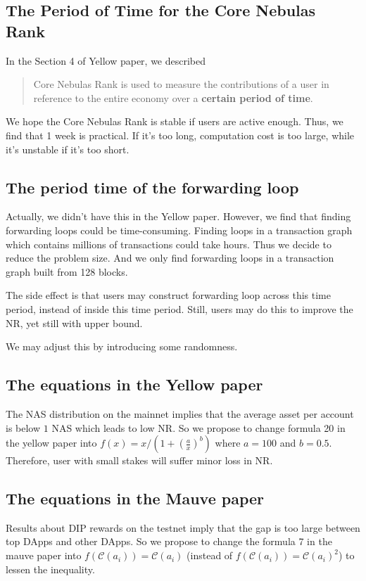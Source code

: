 \documentclass[11pt]{article}
\begin{document}
\subsection{The Period of Time for the Core Nebulas Rank}
In the Section 4 of Yellow paper, we described
\begin{quote}
Core Nebulas Rank is used to measure the contributions of a user in reference
  to the entire economy over a \textbf{certain period of time}.
\end{quote}
\noindent We hope the Core Nebulas Rank is stable if users are active enough.
Thus, we find that 1 week is  practical. If it's too long, computation cost is
too large, while it's unstable if it's too short.

\subsection{The period time of the forwarding loop}
Actually, we didn't have this in the Yellow paper. However, we find that
finding forwarding loops could be time-consuming. Finding loops in a
transaction graph which contains millions of transactions could take hours.
Thus we decide to reduce the problem size. And we only find forwarding loops in
a transaction graph built from 128 blocks.

The side effect is that users may construct forwarding loop across this time
period, instead of inside this time period. Still, users may do this to improve
the NR, yet still with upper bound.

We may adjust this by introducing some randomness.

\subsection{The equations in the Yellow paper}
The NAS distribution on the mainnet implies that the average asset per account is below $1$ NAS which leads to low NR. So we propose to change formula 20 in the yellow paper into $f(x) = x/(1 + (\frac{a}{x})^b)$ where $a=100$ and $b=0.5$. Therefore, user with small stakes will suffer minor loss in NR. 

\subsection{The equations in the Mauve paper}
Results about DIP rewards on the testnet imply that the gap is too large between top DApps and other DApps. So we propose to change the formula 7 in the mauve paper into $f(\mathcal{C}(a_i))=\mathcal{C}(a_i)$ (instead of $f(\mathcal{C}(a_i))=\mathcal{C}(a_i)^2$) to lessen the inequality. 
\end{document}
